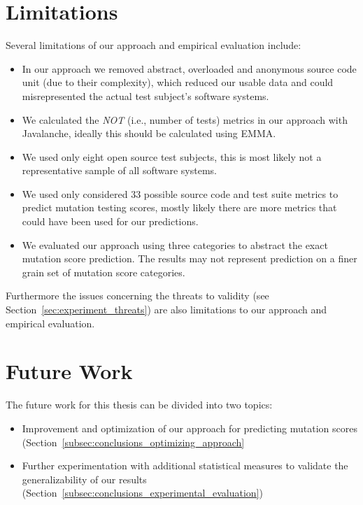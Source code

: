 \section{Limitations}
\label{sec:conclusions_limitations}
Several limitations of our approach and empirical evaluation include:

\begin{itemize}
	\item In our approach we removed abstract, overloaded and anonymous source code unit (due to their complexity), which reduced our usable data and could misrepresented the actual test subject's software systems.
	\item We calculated the \emph{NOT} (i.e., number of tests) metrics in our approach with Javalanche, ideally this should be calculated using EMMA.
	\item We used only eight open source test subjects, this is most likely not a representative sample of all software systems.
	\item We used only considered 33 possible source code and test suite metrics to predict mutation testing scores, mostly likely there are more metrics that could have been used for our predictions.
	\item We evaluated our approach using three categories to abstract the exact mutation score prediction. The results may not represent prediction on a finer grain set of mutation score categories.
\end{itemize}

Furthermore the issues concerning the threats to validity (see Section~\ref{sec:experiment_threats}) are also limitations to our approach and empirical evaluation.


\section{Future Work}
\label{sec:conclusions_future_work}
The future work for this thesis can be divided into two topics:

\begin{itemize}
  \item Improvement and optimization of our approach for predicting mutation scores (Section~\ref{subsec:conclusions_optimizing_approach}
  \item Further experimentation with additional statistical measures to validate the generalizability of our results (Section~\ref{subsec:conclusions_experimental_evaluation})
\end{itemize}

